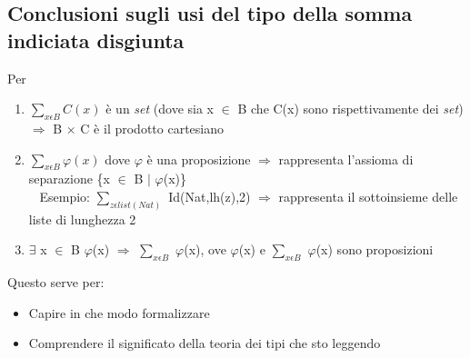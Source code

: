 \subsection{Conclusioni sugli usi del tipo della somma indiciata disgiunta}
\label{subsec:conclusioni-usi-somma-indiciata-disgiunta}
Per
\begin{enumerate}
\item $\sum\limits_{x \epsilon B}C(x)$ \`e un \textit{set} (dove sia x $\in$ B che C(x) sono rispettivamente dei \textit{set}) $\Rightarrow$ B $\times$ C \`e il prodotto cartesiano
\item $\sum\limits_{x \epsilon B}\varphi(x)$ dove $\varphi$ \`e una proposizione $\Rightarrow$ rappresenta l'assioma di separazione \{x $\in$ B $|$ $\varphi$(x)\}\\\
\noindent
Esempio:
$\sum\limits_{z \epsilon list(Nat)}$ Id(Nat,lh(z),2) $\Rightarrow$ rappresenta il sottoinsieme delle liste di lunghezza 2
\item $\exists$ x $\in$ B $\varphi$(x) $\Rightarrow$ $\sum\limits_{x \epsilon B}$ $\varphi$(x), ove $\varphi$(x) e $\sum\limits_{x \epsilon B}$ $\varphi$(x) sono proposizioni
\end{enumerate}
\noindent
Questo serve per:
\begin{itemize}
\item Capire in che modo formalizzare
\item Comprendere il significato della teoria dei tipi che sto leggendo
\end{itemize}

